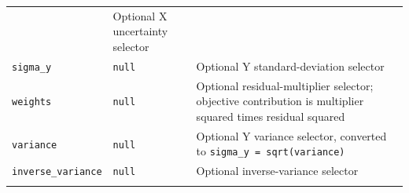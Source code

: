 \documentclass[
  10pt,
  a4paper,
  oneside]{scrreprt}
\begin{document}
\begin{longtable}[]{@{}lll@{}}
\begin{minipage}[t]{0.30\columnwidth}
\end{minipage} & \begin{minipage}[t]{0.30\columnwidth}\raggedright
Optional X uncertainty selector\strut
\end{minipage}\tabularnewline
\begin{minipage}[t]{0.30\columnwidth}\raggedright
\texttt{sigma\_y}\strut
\end{minipage} & \begin{minipage}[t]{0.30\columnwidth}\raggedright
\texttt{null}\strut
\end{minipage} & \begin{minipage}[t]{0.30\columnwidth}\raggedright
Optional Y standard-deviation selector\strut
\end{minipage}\tabularnewline
\begin{minipage}[t]{0.30\columnwidth}\raggedright
\texttt{weights}\strut
\end{minipage} & \begin{minipage}[t]{0.30\columnwidth}\raggedright
\texttt{null}\strut
\end{minipage} & \begin{minipage}[t]{0.30\columnwidth}\raggedright
Optional residual-multiplier selector; objective contribution is
multiplier squared times residual squared\strut
\end{minipage}\tabularnewline
\begin{minipage}[t]{0.30\columnwidth}\raggedright
\texttt{variance}\strut
\end{minipage} & \begin{minipage}[t]{0.30\columnwidth}\raggedright
\texttt{null}\strut
\end{minipage} & \begin{minipage}[t]{0.30\columnwidth}\raggedright
Optional Y variance selector, converted to
\texttt{sigma\_y\ =\ sqrt(variance)}\strut
\end{minipage}\tabularnewline
\begin{minipage}[t]{0.30\columnwidth}\raggedright
\texttt{inverse\_variance}\strut
\end{minipage} & \begin{minipage}[t]{0.30\columnwidth}\raggedright
\texttt{null}\strut
\end{minipage} & \begin{minipage}[t]{0.30\columnwidth}\raggedright
Optional inverse-variance selector\strut
\end{minipage}\tabularnewline
\begin{minipage}[t]{0.30\columnwidth}\raggedright

\end{minipage}
\end{longtable}
\end{document}
